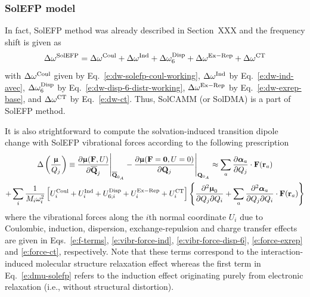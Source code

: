 \documentclass[a4paper,titlepage,twoside,fleqn,12pt]{book}
\newcommand{\BM}[1]{\bm{#1}}
\newcommand{\fderiv}[2]{\ensuremath{
\frac{\partial #1}{\partial #2}}}
\newcommand{\sderivd}[3]{\ensuremath{
\frac{\partial^2 #1}{\partial #2 \partial #3}
}}
\begin{document}
\begin{refsection}
\subsubsection{SolEFP model}

In fact, SolEFP method was already described in Section~XXX
and the frequency shift is given as
%
\begin{equation} \label{e:dw-solefp}
\Delta\omega^{\rm SolEFP} = 
\Delta\omega^{\rm Coul} + \Delta\omega^{\rm Ind} + \Delta\omega^{\rm Disp}_6 +
\Delta\omega^{\rm Ex-Rep} + \Delta\omega^{\rm CT}
\end{equation}
%
with $\Delta\omega^{\rm Coul}$ given by Eq.~\eqref{e:dw-solefp-coul-working},  
$\Delta\omega^{\rm Ind}$ by Eq.~\eqref{e:dw-ind-avec},
$\Delta\omega^{\rm Disp}_6$ by Eq.~\eqref{e:dw-disp-6-distr-working},
$\Delta\omega^{\rm Ex-Rep}$ by Eq.~\eqref{e:dw-exrep-base},
and $\Delta\omega^{\rm CT}$ by Eq.~\eqref{e:dw-ct}.
Thus, SolCAMM (or SolDMA) is a part of SolEFP method. 

It is also strightforward to compute the 
solvation\hyp{}induced transition dipole change
with SolEFP vibrational forces according to the following prescription
%
\begin{multline} \label{e:dmu-solefp}
\Delta\left(\frac{{\BM \upmu}}{Q_j}\right) \equiv 
 \frac{\partial{\BM \upmu}({\bf F},U)}{\partial\overline {\bf Q}_j} \Bigg|_{\overline{\bf Q}_{0_A}} -  
 \frac{\partial{\BM \upmu}({\bf F}={\bf 0},U=0)}{\partial {\bf Q}_j} \Bigg|_{{\bf Q}_{0_A}} \approx
%
\sum_a 
\fderiv{{\BM \alpha}_{a}}{Q_j} \cdot {\bf F}({\bf r}_a) \\
+
\sum_i 
\frac{1}{M_i\omega_i^2} 
\left[
 U^{\rm Coul}_i   + 
 U^{\rm Ind}_i    +
 U^{\rm Disp}_{6;i}   +
 U^{\rm Ex-Rep}_i +
 U^{\rm CT}_i
\right]
%
\left\{ 
 \sderivd{{\BM \upmu}_0}{Q_j}{Q_i} 
 + \sum_a \sderivd{{\BM \alpha}_{a}}{Q_j}{Q_i} \cdot {\bf F}({\bf r}_a)
%
\right\}  
\end{multline}
%
where the vibrational forces along the $i$th normal coordinate
$U_i$ due to Coulombic, induction, dispersion, exchange\hyp{}repulsion
and charge transfer effects are given in Eqs.~\eqref{e:f-terms},
\eqref{e:vibr-force-ind}, \eqref{e:vibr-force-disp-6}, 
\eqref{e:force-exrep} and \eqref{e:force-ct}, respectively.
Note that these terms correspond to the interaction\hyp{}induced
molecular structure relaxation effect
whereas the first term in Eq.~\eqref{e:dmu-solefp}
refers to the induction effect originating purely from
electronic relaxation (i.e., without structural distortion).


\end{refsection}
\end{document}
